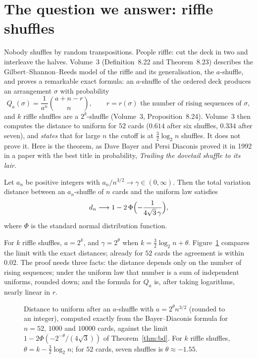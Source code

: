 \section{The question we answer: riffle shuffles}

Nobody shuffles by random transpositions. People riffle: cut the deck in two and interleave the halves. Volume~3 (Definition~8.22 and
Theorem~8.23) describes the Gilbert--Shannon--Reeds model of the riffle and its generalisation, the $a$-shuffle, and proves a
remarkable exact formula: an $a$-shuffle of the ordered deck produces an arrangement $\sigma$ with probability
\[
Q_a(\sigma)=\frac1{a^n}\binom{a+n-r}n,\qquad r=r(\sigma)\text{ the number of rising sequences of }\sigma,
\]
and $k$ riffle shuffles are a $2^k$-shuffle (Volume~3, Proposition~8.24). Volume~3 then computes the distance to uniform for $52$ cards ($0.614$ after six
shuffles, $0.334$ after seven), and \emph{states} that for large $n$ the cutoff is at $\frac32\log_2n$ shuffles. It does not prove it. Here is the
theorem, as Dave Bayer and Persi Diaconis proved it in 1992 in a paper with the best title in probability, \emph{Trailing the dovetail shuffle
to its lair}.

\begin{theorem}\label{thm:bd}
Let $a_n$ be positive integers with $a_n/n^{3/2}\to\gamma\in(0,\infty)$. Then the total variation distance between an $a_n$-shuffle of $n$ cards and the
uniform law satisfies
\[
d_n\longrightarrow1-2\,\Phi\Bigl(-\frac1{4\sqrt3\,\gamma}\Bigr),
\]
where $\Phi$ is the standard normal distribution function.
\end{theorem}

For $k$ riffle shuffles, $a=2^k$, and $\gamma=2^\theta$ when $k=\frac32\log_2n+\theta$. Figure~\ref{fig:riffle15} compares the limit with the exact distances; already for $52$
cards the agreement is within $0.02$. The proof needs three facts: the distance depends only on the number of rising sequences; under the
uniform law that number is a sum of independent uniforms, rounded down; and the formula for $Q_a$ is, after taking logarithms, nearly linear in $r$.

\begin{figure}[ht]
\centering
{}
\caption{Distance to uniform after an $a$-shuffle with $a=2^\theta n^{3/2}$ (rounded to an integer), computed exactly from the Bayer--Diaconis formula for $n=52$,
$1000$ and $10000$ cards, against the limit $1-2\Phi(-2^{-\theta}/(4\sqrt3))$ of Theorem~\ref{thm:bd}. For $k$ riffle shuffles, $\theta=k-\frac32\log_2n$; for $52$ cards,
seven shuffles is $\theta\approx-1.55$.}
\label{fig:riffle15}
\end{figure}

